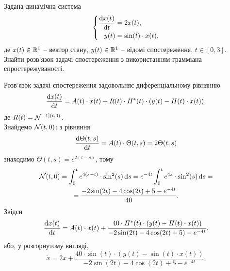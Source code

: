\begin{problem}
    Задана динамічна система \[ \left\{ \begin{aligned} 
    	\frac{\mathop{}\!\mathrm{d} x(t)}{\mathop{}\!\mathrm{d} t} &= 2 x(t), \\
    	y(t) &= \sin (t) \cdot x(t),
    \end{aligned} \right. \]
    де $x(t) \in \mathbb{R}^1$ -- вектор стану, $y(t) \in \mathbb{R}^1$ -- відомі спостереження, $t \in [0, 3]$. Знайти розв'язок задачі спостереження з використанням грамміана спростережуваності.
\end{problem}

\begin{solution}
    Розв'язок задачі спостереження задовольняє диференціальному рівнянню \[ \frac{\mathop{}\!\mathrm{d} x(t)}{\mathop{}\!\mathrm{d} t} = A(t) \cdot x(t) + R(t) \cdot H^*(t) \cdot (y(t) - H(t) \cdot x(t)), \] де $R(t) = \mathcal{N}^{-1](t, 0)}$. \\

    Знайдемо $\mathcal{N}(t, 0)$: з рівняння \[ \frac{\mathop{}\!\mathrm{d} \Theta(t, s)}{\mathop{}\!\mathrm{d} t} = A(t)\cdot \Theta(t, s) = 2\Theta(t, s) \] знаходимо $\Theta(t, s) = e^{2 (t - s)}$, тому \begin{multline*} \mathcal{N}(t, 0) = \int_0^t e^{4 (s - t)} \cdot \sin^2(s) \mathop{}\!\mathrm{d} s = e^{-4t} \int_0^t e^{4 s} \cdot \sin^2(s) \mathop{}\!\mathrm{d} s = \\
    = \frac{-2 \sin (2t) - 4 \cos(2t) + 5 - e^{-4t}}{40}. \end{multline*} Звідси \[ \frac{\mathop{}\!\mathrm{d} x(t)}{\mathop{}\!\mathrm{d} t} = A(t) \cdot x(t) + \frac{40 \cdot H^*(t) \cdot (y(t) - H(t) \cdot x(t))}{-2 \sin (2t) - 4 \cos(2t) + 5) - e^{-4t}} , \] або, у розгорнутому вигляді, \[ \dot x = 2 x + \frac{40 \cdot \sin(t) \cdot (y(t) - \sin(t) \cdot x(t))}{-2 \sin (2t) - 4 \cos(2t) + 5 - e^{-4t}}. \]
\end{solution}

\begin{problem}
\end{problem}

\begin{solution}
\end{solution}
